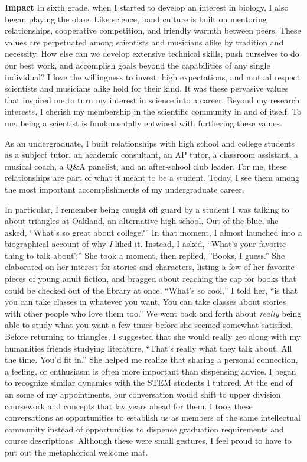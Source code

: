 \textbf{Impact}
In sixth grade, when I started to develop an interest in biology, I also began playing the oboe.
Like science, band culture is built on mentoring relationships, cooperative competition, and friendly warmth between peers.
These values are perpetuated among scientists and musicians alike by tradition and necessity.
How else can we develop extensive technical skills, push ourselves to do our best work, and accomplish goals beyond the capabilities of any single individual?
I love the willingness to invest, high expectations, and mutual respect scientists and musicians alike hold for their kind.
It was these pervasive values that inspired me to turn my interest in science into a career.
Beyond my research interests, I cherish my membership in the scientific community in and of itself.
To me, being a scientist is fundamentally entwined with furthering these values.

As an undergraduate, I built relationships with high school and college students as a subject tutor, an academic consultant, an AP tutor, a classroom assistant, a musical coach, a Q\&A panelist, and an after-school club leader.
For me, these relationships are part of what it meant to be a student.
Today, I see them among the most important accomplishments of my undergraduate career.

In particular, I remember being caught off guard by a student I was talking to about triangles at Oakland, an alternative high school.
Out of the blue, she asked, ``What's so great about college?''
In that moment, I almost launched into a biographical account of why \textit{I} liked it.
Instead, I asked, ``What's your favorite thing to talk about?''
She took a moment, then replied, ''Books, I guess.''
She elaborated on her interest for stories and characters, listing a few of her favorite pieces of young adult fiction, and bragged about reaching the cap for books that could be checked out of the library at once.
``What's so cool,'' I told her, ``is that you can take classes in whatever you want.
You can take classes about stories with other people who love them too.''
We went back and forth about \textit{really} being able to study what you want a few times before she seemed somewhat satisfied.
Before returning to triangles, I suggested that she would really get along with my humanities friends studying literature,
``That's really what they talk about.
All the time.
You'd fit in.''
She helped me realize that sharing a personal connection, a feeling, or enthusiasm is often more important than dispensing advice.
I began to recognize similar dynamics with the STEM students I tutored.
At the end of an some of my appointments, our conversation would shift to upper division coursework  and concepts that lay years ahead for them.
I took these conversations as opportunities to establish us as members of the same intellectual community instead of opportunities to dispense graduation requirements and course descriptions.
Although these were small gestures, I feel proud to have to put out the metaphorical welcome mat.

